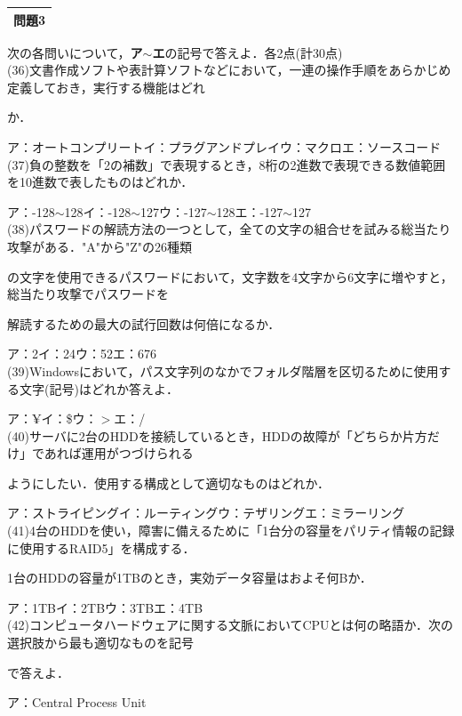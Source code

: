 \noindent\begin{tabular}{|c|} %
  \hline
  問題3 \\
  \hline
\end{tabular}
次の各問いについて，\textbf{ア$\sim$エ}の記号で答えよ．各2点(計30点)\\
(36)文書作成ソフトや表計算ソフトなどにおいて，一連の操作手順をあらかじめ定義しておき，実行する機能はどれ\par\quad か．\par\quad
ア：オートコンプリート\quad イ：プラグアンドプレイ\quad ウ：マクロ\quad エ：ソースコード\\
(37)負の整数を「2の補数」で表現するとき，8桁の2進数で表現できる数値範囲を10進数で表したものはどれか．\par\quad
ア：-128$\sim$128\quad イ：-128$\sim$127\quad ウ：-127$\sim$128\quad エ：-127$\sim$127\\
(38)パスワードの解読方法の一つとして，全ての文字の組合せを試みる総当たり攻撃がある．"A"から"Z"の26種類\par\quad の文字を使用できるパスワードにおいて，文字数を4文字から6文字に増やすと，総当たり攻撃でパスワードを\par\quad 解読するための最大の試行回数は何倍になるか．\par\quad
ア：2\quad イ：24\quad ウ：52\quad エ：676\\
(39)Windowsにおいて，パス文字列のなかでフォルダ階層を区切るために使用する文字(記号)はどれか答えよ．\par\quad
ア：¥\quad イ：\$\quad ウ：$>$\quad エ：/\\
(40)サーバに2台のHDDを接続しているとき，HDDの故障が「どちらか片方だけ」であれば運用がつづけられる\par\quad ようにしたい．使用する構成として適切なものはどれか．\par\quad
ア：ストライピング\quad イ：ルーティング\quad ウ：テザリング\quad エ：ミラーリング\\
(41)4台のHDDを使い，障害に備えるために「1台分の容量をパリティ情報の記録に使用するRAID5」を構成する．\par\quad 1台のHDDの容量が1TBのとき，実効データ容量はおよそ何Bか．\par\quad
ア：1TB\quad イ：2TB\quad ウ：3TB\quad エ：4TB\\
(42)コンピュータハードウェアに関する文脈においてCPUとは何の略語か．次の選択肢から最も適切なものを記号\par\quad で答えよ．\par\quad
ア：Central Process Unit\par\quad
